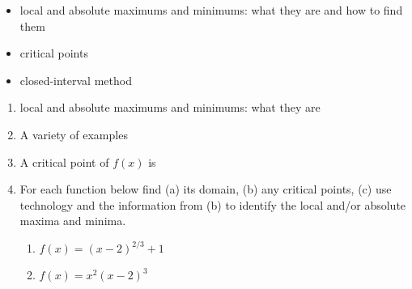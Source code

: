 \documentclass[11pt,fleqn]{article}
\begin{document}
\setlength{\parindent}{0cm}
\renewcommand{\headrulewidth}{0pt}
\newcommand{\blank}[1]{\rule{#1}{0.75pt}}
\renewcommand{\d}{\displaystyle}
\vspace*{-0.7in}
\begin{center}
 {\large{ }}
\end{center}
 \begin{itemize}
 \item local and absolute maximums and minimums: what they are and how to find them
 \item critical points
 \item closed-interval method
 \end{itemize}
 \begin{enumerate}
 \item local and absolute maximums and minimums: what they are
 \vfill
 \item A variety of examples
 \vfill
 \newpage
 \item A critical point of $f(x)$ is 
 \vspace{1in}
 \item For each function below find (a) its domain, (b) any critical points, (c) use technology and the information from (b) to identify the local and/or absolute maxima and minima. 
 \begin{enumerate}
 \item $f(x)= (x-2)^{2/3}+1$
 \vfill
 \item $f(x)=x^2(x-2)^3$
 \vfill
 \end{enumerate}
 \end{enumerate}
\end{document}
